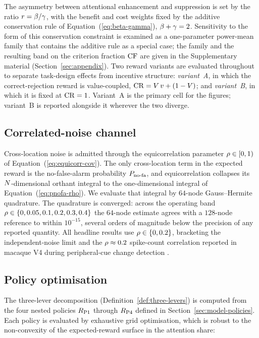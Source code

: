 The asymmetry between attentional enhancement and suppression is set by
the ratio $r = \beta/\gamma$, with the benefit and cost weights
fixed by the additive conservation rule of
Equation~(\ref{eq:beta-gamma}), $\beta + \gamma = 2$. Sensitivity to
the form of this conservation constraint is examined as a one-parameter
power-mean family that contains the additive rule as a special case;
the family and the resulting band on the criterion fraction $\mathrm{CF}$ are
given in the Supplementary material (Section~\ref{sec:appendix}). Two
reward variants are evaluated throughout to separate task-design effects
from incentive structure: \emph{variant~A}, in which the
correct-rejection reward is value-coupled, $\mathrm{CR} = V\,v +
(1-V)$; and \emph{variant~B}, in which it is fixed at $\mathrm{CR} = 1$.
Variant~A is the primary cell for the figures; variant~B is reported
alongside it wherever the two diverge.

\subsection{Correlated-noise channel}
\label{sec:methods-quadrature}

Cross-location noise is admitted through the equicorrelation parameter
$\rho \in [0, 1)$ of Equation~(\ref{eq:equicorr-cov}). The only
cross-location term in the expected reward is the no-false-alarm
probability $P_{\mathrm{no\text{-}fa}}$, and equicorrelation collapses its
$N$-dimensional orthant integral to the one-dimensional integral of
Equation~(\ref{eq:pnofa-rho}). We evaluate that integral by $64$-node
Gauss--Hermite quadrature. The quadrature is converged: across the
operating band $\rho \in \{0, 0.05, 0.1, 0.2, 0.3, 0.4\}$ the $64$-node
estimate agrees with a $128$-node reference to within $10^{-15}$,
several orders of magnitude below the precision of any reported
quantity. All headline results use $\rho \in \{0, 0.2\}$, bracketing
the independent-noise limit and the $\rho \approx 0.2$ spike-count
correlation reported in macaque V4 during peripheral-cue change
detection \cite{CohenMaunsell2009}.

\subsection{Policy optimisation}
\label{sec:methods-optimisation}

The three-lever decomposition (Definition~\ref{def:three-levers}) is
computed from the four nested policies $R_{\mathrm{P1}}$ through $R_{\mathrm{P4}}$
defined in Section~\ref{sec:model-policies}. Each policy is evaluated by
exhaustive grid optimisation, which is robust to the non-convexity of
the expected-reward surface in the attention share:

